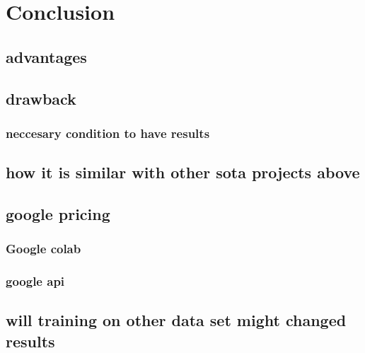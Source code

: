 
\chapter{Conclusion}	

\section{advantages}

\section{drawback}

\subsection{neccesary condition to have results}

\section{how it is similar with other sota projects above}

\section{google pricing }

\subsection{Google colab}

\subsection{google api}

\section{will training on other data set might changed results }
